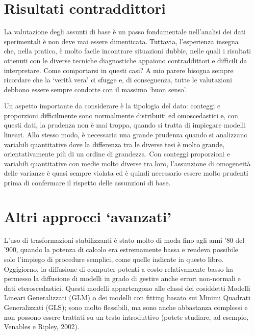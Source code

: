 \documentclass[
  12pt,
]{book}
\begin{document}
\hypertarget{risultati-contraddittori}{%
\section{Risultati contraddittori}\label{risultati-contraddittori}}

La valutazione degli assunti di base è un passo fondamentale nell'analisi dei dati sperimentali è non deve mai essere dimenticata. Tuttavia, l'esperienza insegna che, nella pratica, è molto facile incontrare situazioni dubbie, nelle quali i risultati ottenuti con le diverse tecniche diagnostiche appaiono contraddittori e difficili da interpretare. Come comportarsi in questi casi? A mio parere bisogna sempre ricordare che la `verità vera' ci sfugge e, di conseguenza, tutte le valutazioni debbono essere sempre condotte con il massimo `buon senso'.

Un aspetto importante da considerare è la tipologia del dato: conteggi e proporzioni difficilmente sono normalmente distribuiti ed omoscedastici e, con questi dati, la prudenza non è mai troppa, quando si tratta di impiegare modelli lineari. Allo stesso modo, è necessaria una grande prudenza quando si analizzano variabili quantitative dove la differenza tra le diverse tesi è molto grande, orientativamente più di un ordine di grandezza. Con conteggi proporzioni e variabili quantitative con medie molto diverse tra loro, l'assunzione di omogeneità delle varianze è quasi sempre violata ed è quindi necessario essere molto prudenti prima di confermare il rispetto delle assunzioni di base.

\hypertarget{altri-approcci-avanzati}{%
\section{Altri approcci `avanzati'}\label{altri-approcci-avanzati}}

L'uso di trasformazioni stabilizzanti è stato molto di moda fino agli anni '80 del '900, quando la potenza di calcolo era estremamente bassa e rendeva possibile solo l'impiego di procedure semplici, come quelle indicate in questo libro. Oggigiorno, la diffusione di computer potenti a costo relativamente basso ha permesso la diffusione di modelli in grado di gestire anche errori non-normali e dati eteroscedastici. Questi modelli appartengono alle classi dei cosiddetti Modelli Lineari Generalizzati (GLM) o dei modelli con fitting basato sui Minimi Quadrati Generalizzati (GLS); sono molto flessibili, ma sono anche abbastanza complessi e non possono essere trattati su un testo introduttivo (potete studiare, ad esempio, Venables e Ripley, 2002).
\end{document}
